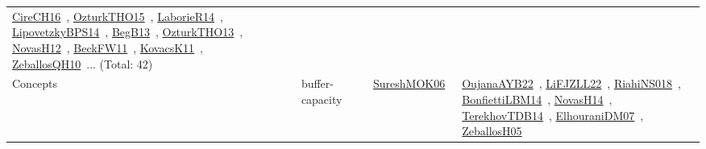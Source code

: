 {\begin{longtable}{lp{3cm}>{\raggedright\arraybackslash}p{6cm}>{\raggedright\arraybackslash}p{6cm}>{\raggedright\arraybackslash}p{8cm}}
\href{../works/CireCH16.pdf}{CireCH16}~\cite{CireCH16}, \href{../works/OzturkTHO15.pdf}{OzturkTHO15}~\cite{OzturkTHO15}, \href{../works/LaborieR14.pdf}{LaborieR14}~\cite{LaborieR14}, \href{../works/LipovetzkyBPS14.pdf}{LipovetzkyBPS14}~\cite{LipovetzkyBPS14}, \href{../works/BegB13.pdf}{BegB13}~\cite{BegB13}, \href{../works/OzturkTHO13.pdf}{OzturkTHO13}~\cite{OzturkTHO13}, \href{../works/NovasH12.pdf}{NovasH12}~\cite{NovasH12}, \href{../works/BeckFW11.pdf}{BeckFW11}~\cite{BeckFW11}, \href{../works/KovacsK11.pdf}{KovacsK11}~\cite{KovacsK11}, \href{../works/ZeballosQH10.pdf}{ZeballosQH10}~\cite{ZeballosQH10}... (Total: 42)\\
Concepts & buffer-capacity &  & \href{../works/SureshMOK06.pdf}{SureshMOK06}~\cite{SureshMOK06} & \href{../works/OujanaAYB22.pdf}{OujanaAYB22}~\cite{OujanaAYB22}, \href{../works/LiFJZLL22.pdf}{LiFJZLL22}~\cite{LiFJZLL22}, \href{../works/RiahiNS018.pdf}{RiahiNS018}~\cite{RiahiNS018}, \href{../works/BonfiettiLBM14.pdf}{BonfiettiLBM14}~\cite{BonfiettiLBM14}, \href{../works/NovasH14.pdf}{NovasH14}~\cite{NovasH14}, \href{../works/TerekhovTDB14.pdf}{TerekhovTDB14}~\cite{TerekhovTDB14}, \href{../works/ElhouraniDM07.pdf}{ElhouraniDM07}~\cite{ElhouraniDM07}, \href{../works/ZeballosH05.pdf}{ZeballosH05}~\cite{ZeballosH05}\\

\end{longtable}}
